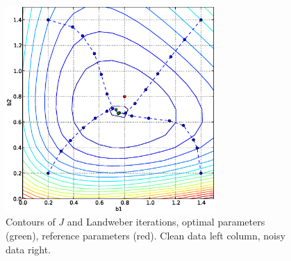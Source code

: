 \begin{figure}
\begin{center}
    \includegraphics[width=8cm]{chapters/schroll/eps/b1b2scan4-5.eps}
    \end{center}
  \caption{Contours of $J$ and Landweber iterations, optimal parameters (green), reference parameters (red). 
   Clean data left column, noisy data right. \label{fig2}}
\end{figure}

